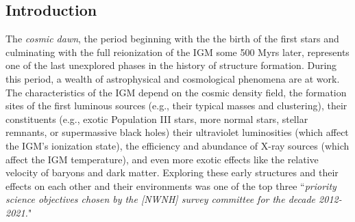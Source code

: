 \documentclass[preprint]{aastex}
\begin{document}
\subsection{Introduction}    %


The {\it cosmic dawn}, the period beginning with the the birth of the first stars and culminating with the full
reionization of the IGM some 500 Myrs later, represents one of the last unexplored phases in 
the history of structure formation. During this period, a wealth of astrophysical and cosmological phenomena are at 
work. The characteristics of the IGM depend on the cosmic density field, the formation sites of the 
first luminous sources (e.g., their typical masses and clustering), their constituents (e.g., exotic Population III 
stars, more normal stars, stellar remnants, or supermassive black holes) their ultraviolet luminosities (which affect 
the IGM's ionization state), the efficiency and abundance of X-ray sources (which affect the IGM temperature), and 
even more exotic effects like the relative velocity of baryons and dark matter.  Exploring these early structures and their 
effects on each other and their environments was one of the top three ``{\it priority science objectives chosen by 
the [NWNH] survey committee for the decade 2012-2021.}"
\end{document}
